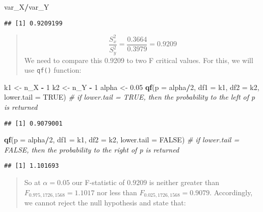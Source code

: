 \documentclass[
]{article}
\newenvironment{Shaded}{\begin{snugshade}}{\end{snugshade}}
\newcommand{\AttributeTok}[1]{\textcolor[rgb]{0.13,0.29,0.53}{#1}}
\newcommand{\CommentTok}[1]{\textcolor[rgb]{0.56,0.35,0.01}{\textit{#1}}}
\newcommand{\ConstantTok}[1]{\textcolor[rgb]{0.56,0.35,0.01}{#1}}
\newcommand{\DecValTok}[1]{\textcolor[rgb]{0.00,0.00,0.81}{#1}}
\newcommand{\FloatTok}[1]{\textcolor[rgb]{0.00,0.00,0.81}{#1}}
\newcommand{\FunctionTok}[1]{\textcolor[rgb]{0.13,0.29,0.53}{\textbf{#1}}}
\newcommand{\NormalTok}[1]{#1}
\newcommand{\OtherTok}[1]{\textcolor[rgb]{0.56,0.35,0.01}{#1}}
\newcommand{\SpecialCharTok}[1]{\textcolor[rgb]{0.81,0.36,0.00}{\textbf{#1}}}
\begin{document}
\begin{Shaded}
\begin{Highlighting}[]
\NormalTok{var\_X}\SpecialCharTok{/}\NormalTok{var\_Y}
\end{Highlighting}
\end{Shaded}

\begin{verbatim}
## [1] 0.9209199
\end{verbatim}

\begin{quote}
\[
\frac{S_x^2}{S_y^2} = \frac{0.3664}{0.3979} = 0.9209
\] We need to compare this 0.9209 to two F critical values. For this, we
will use \texttt{qf()} function:
\end{quote}

\begin{Shaded}
\begin{Highlighting}[]
\NormalTok{k1 }\OtherTok{\textless{}{-}}\NormalTok{ n\_X }\SpecialCharTok{{-}} \DecValTok{1}
\NormalTok{k2 }\OtherTok{\textless{}{-}}\NormalTok{ n\_Y }\SpecialCharTok{{-}} \DecValTok{1}
\NormalTok{alpha }\OtherTok{\textless{}{-}} \FloatTok{0.05}
\FunctionTok{qf}\NormalTok{(}\AttributeTok{p =}\NormalTok{ alpha}\SpecialCharTok{/}\DecValTok{2}\NormalTok{, }\AttributeTok{df1 =}\NormalTok{ k1, }\AttributeTok{df2 =}\NormalTok{ k2, }\AttributeTok{lower.tail =} \ConstantTok{TRUE}\NormalTok{) }\CommentTok{\# if lower.tail = TRUE, then the probability to the left of p is returned}
\end{Highlighting}
\end{Shaded}

\begin{verbatim}
## [1] 0.9079001
\end{verbatim}

\begin{Shaded}
\begin{Highlighting}[]
\FunctionTok{qf}\NormalTok{(}\AttributeTok{p =}\NormalTok{ alpha}\SpecialCharTok{/}\DecValTok{2}\NormalTok{, }\AttributeTok{df1 =}\NormalTok{ k1, }\AttributeTok{df2 =}\NormalTok{ k2, }\AttributeTok{lower.tail =} \ConstantTok{FALSE}\NormalTok{) }\CommentTok{\# if lower.tail = FALSE, then the probability to the right of p is returned}
\end{Highlighting}
\end{Shaded}

\begin{verbatim}
## [1] 1.101693
\end{verbatim}

\begin{quote}
So at \(\alpha = 0.05\) our F-statistic of \(0.9209\) is neither greater
than \(F_{0.975,1726,1568} = 1.1017\) nor less than
\(F_{0.025,1726,1568} = 0.9079.\) Accordingly, we cannot reject the null
hypothesis and state that:
\end{quote}
\end{document}
